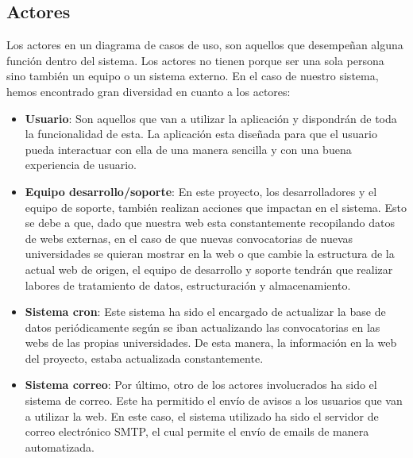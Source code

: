 \subsection{Actores}
Los actores en un diagrama de casos de uso, son aquellos que desempeñan alguna función dentro del sistema. Los actores no tienen porque ser una sola persona sino también un equipo o un sistema externo. En el caso de nuestro sistema, hemos encontrado gran diversidad en cuanto a los actores:

\begin{itemize}
\item\textbf{Usuario}: Son aquellos que van a utilizar la aplicación y dispondrán de toda la funcionalidad de esta. La aplicación esta diseñada para que el usuario pueda interactuar con ella de una manera sencilla y con una buena experiencia de usuario.
\item\textbf{Equipo desarrollo/soporte}: En este proyecto, los desarrolladores y el equipo de soporte, también realizan acciones que impactan en el sistema. Esto se debe a que, dado que nuestra web esta constantemente recopilando datos de webs externas, en el caso de que nuevas convocatorias de nuevas universidades se quieran mostrar en la web o que cambie la estructura de la actual web de origen, el equipo de desarrollo y soporte tendrán que realizar labores de tratamiento de datos, estructuración y almacenamiento.
\item\textbf{Sistema cron}: Este sistema ha sido el encargado de actualizar la base de datos periódicamente según se iban actualizando las convocatorias en las webs de las propias universidades. De esta manera, la información en la web del proyecto, estaba actualizada constantemente.
\item\textbf{Sistema correo}: Por último, otro de los actores involucrados ha sido el sistema de correo. Este ha permitido el envío de avisos a los usuarios que van a utilizar la web. En este caso, el sistema utilizado ha sido el servidor de correo electrónico SMTP, el cual permite el envío de emails de manera automatizada.
\end{itemize}


